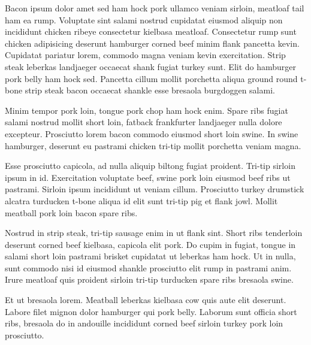 \documentclass{article}
\begin{document}
Bacon ipsum dolor amet sed ham hock pork ullamco veniam sirloin, meatloaf tail ham ea rump. Voluptate sint salami nostrud cupidatat eiusmod aliquip non incididunt chicken ribeye consectetur kielbasa meatloaf. Consectetur rump sunt chicken adipisicing deserunt hamburger corned beef minim flank pancetta kevin. Cupidatat pariatur lorem, commodo magna veniam kevin exercitation. Strip steak leberkas landjaeger occaecat shank fugiat turkey sunt. Elit do hamburger pork belly ham hock sed. Pancetta cillum mollit porchetta aliqua ground round t-bone strip steak bacon occaecat shankle esse bresaola burgdoggen salami.

Minim tempor pork loin, tongue pork chop ham hock enim. Spare ribs fugiat salami nostrud mollit short loin, fatback frankfurter landjaeger nulla dolore excepteur. Prosciutto lorem bacon commodo eiusmod short loin swine. In swine hamburger, deserunt eu pastrami chicken tri-tip mollit porchetta veniam magna.

Esse prosciutto capicola, ad nulla aliquip biltong fugiat proident. Tri-tip sirloin ipsum in id. Exercitation voluptate beef, swine pork loin eiusmod beef ribs ut pastrami. Sirloin ipsum incididunt ut veniam cillum. Prosciutto turkey drumstick alcatra turducken t-bone aliqua id elit sunt tri-tip pig et flank jowl. Mollit meatball pork loin bacon spare ribs.

Nostrud in strip steak, tri-tip sausage enim in ut flank sint. Short ribs tenderloin deserunt corned beef kielbasa, capicola elit pork. Do cupim in fugiat, tongue in salami short loin pastrami brisket cupidatat ut leberkas ham hock. Ut in nulla, sunt commodo nisi id eiusmod shankle prosciutto elit rump in pastrami anim. Irure meatloaf quis proident sirloin tri-tip turducken spare ribs bresaola swine.

Et ut bresaola lorem. Meatball leberkas kielbasa cow quis aute elit deserunt. Labore filet mignon dolor hamburger qui pork belly. Laborum sunt officia short ribs, bresaola do in andouille incididunt corned beef sirloin turkey pork loin prosciutto.
\end{document}
